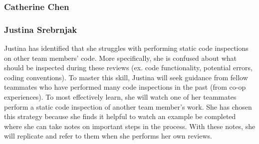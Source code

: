 \documentclass[12pt, titlepage]{article}
\begin{document}
	\subsubsection*{Catherine Chen}
	
	\subsubsection*{Justina Srebrnjak}
	Justina has identified that she struggles with performing static code inspections on other team members' code. More specifically, she is confused about what should be inspected during these reviews (ex. code functionality, potential errors, coding conventions). To master this skill, Justina will seek guidance from fellow teammates who have performed many code inspections in the past (from co-op experiences). To most effectively learn, she will watch one of her teammates perform a static code inspection of another team member's work. She has chosen this strategy because she finds it helpful to watch an example be completed where she can take notes on important steps in the process. With these notes, she will replicate and refer to them when she performs her own reviews.
	
\end{document}
